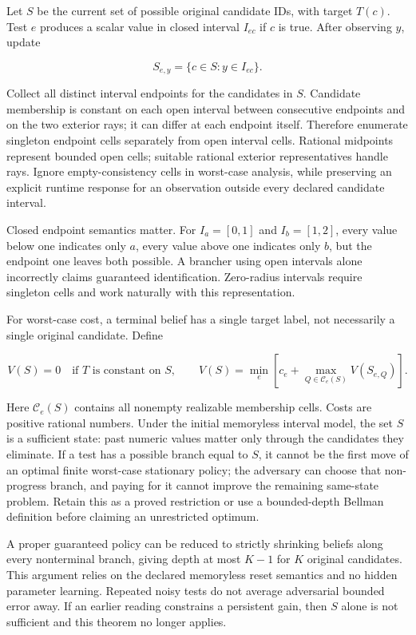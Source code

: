 \documentclass[
  11pt,
  a4paper,
]{report}
\begin{document}
Let \(S\) be the current set of possible original candidate IDs, with
target \(T(c)\). Test \(e\) produces a scalar value in closed interval
\(I_{ec}\) if \(c\) is true. After observing \(y\), update

\[
S_{e,y}=\{c\in S:y\in I_{ec}\}.
\]

Collect all distinct interval endpoints for the candidates in \(S\).
Candidate membership is constant on each open interval between
consecutive endpoints and on the two exterior rays; it can differ at
each endpoint itself. Therefore enumerate singleton endpoint cells
separately from open interval cells. Rational midpoints represent
bounded open cells; suitable rational exterior representatives handle
rays. Ignore empty-consistency cells in worst-case analysis, while
preserving an explicit runtime response for an observation outside every
declared candidate interval.

Closed endpoint semantics matter. For \(I_a=[0,1]\) and \(I_b=[1,2]\),
every value below one indicates only \(a\), every value above one
indicates only \(b\), but the endpoint one leaves both possible. A
brancher using open intervals alone incorrectly claims guaranteed
identification. Zero-radius intervals require singleton cells and work
naturally with this representation.

For worst-case cost, a terminal belief has a single target label, not
necessarily a single original candidate. Define

\[
V(S)=0\quad\text{if }T\text{ is constant on }S,
\qquad
V(S)=\min_e\left[c_e+\max_{Q\in\mathcal C_e(S)}V(S_{e,Q})\right].
\]

Here \(\mathcal C_e(S)\) contains all nonempty realizable membership
cells. Costs are positive rational numbers. Under the initial memoryless
interval model, the set \(S\) is a sufficient state: past numeric values
matter only through the candidates they eliminate. If a test has a
possible branch equal to \(S\), it cannot be the first move of an
optimal finite worst-case stationary policy; the adversary can choose
that non-progress branch, and paying for it cannot improve the remaining
same-state problem. Retain this as a proved restriction or use a
bounded-depth Bellman definition before claiming an unrestricted
optimum.

A proper guaranteed policy can be reduced to strictly shrinking beliefs
along every nonterminal branch, giving depth at most \(K-1\) for \(K\)
original candidates. This argument relies on the declared memoryless
reset semantics and no hidden parameter learning. Repeated noisy tests
do not average adversarial bounded error away. If an earlier reading
constrains a persistent gain, then \(S\) alone is not sufficient and
this theorem no longer applies.
\end{document}
